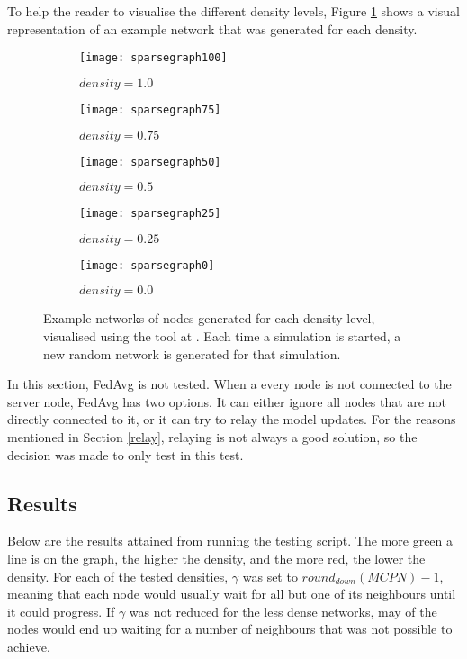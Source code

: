 To help the reader to visualise the different density levels, Figure \ref{densefig} shows a visual representation of an example network that was generated for each density.

\begin{figure}[H]
	\centering
	\begin{subfigure}[b]{0.35\textwidth}
		\centering
		\texttt{[image: sparsegraph100]}
		\caption{$density=1.0$}
	\end{subfigure}
	\begin{subfigure}[b]{0.35\textwidth}
		\centering
		\texttt{[image: sparsegraph75]}
		\caption{$density=0.75$}
	\end{subfigure}
	\begin{subfigure}[b]{0.35\textwidth}
		\centering
		\texttt{[image: sparsegraph50]}
		\caption{$density=0.5$}
	\end{subfigure}
	\begin{subfigure}[b]{0.35\textwidth}
		\centering
		\texttt{[image: sparsegraph25]}
		\caption{$density=0.25$}
	\end{subfigure}
	\begin{subfigure}[b]{0.35\textwidth}
		\centering
		\texttt{[image: sparsegraph0]}
		\caption{$density=0.0$}
	\end{subfigure}
	\caption{Example networks of nodes generated for each density level, visualised using the tool at \cite{graphsite}. Each time a simulation is started, a new random network is generated for that simulation. \label{densefig}}
\end{figure}


In this section, FedAvg is not tested. When a every node is not connected to the server node, FedAvg has two options. It can either ignore all nodes that are not directly connected to it, or it can try to relay the model updates. For the reasons mentioned in Section \ref{relay}, relaying is not always a good solution, so the decision was made to only test \SL in this test.


\subsection{Results}
Below are the results attained from running the testing script. The more green a line is on the graph, the higher the density, and the more red, the lower the density. For each of the tested densities, $\gamma$ was set to $round_{down}(MCPN) - 1$, meaning that each node would usually wait for all but one of its neighbours until it could progress. If $\gamma$ was not reduced for the less dense networks, may of the nodes would end up waiting for a number of neighbours that was not possible to achieve.

